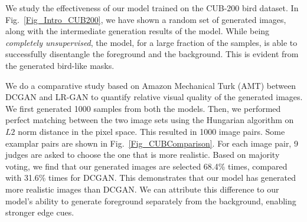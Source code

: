 \documentclass{article} \usepackage{iclr2017_conference,times}
\begin{document}
We study the effectiveness of our model trained on the CUB-200 bird dataset. In Fig.~\ref{Fig_Intro_CUB200}, we have shown a random set of generated images, along with the intermediate generation results of the model. While being \emph{completely unsupervised}, the model, for a large fraction of the samples, is able to successfully disentangle the foreground and the background. This is evident from the generated bird-like masks.


We do a comparative study based on Amazon Mechanical Turk (AMT) between DCGAN and LR-GAN to quantify relative visual quality of the generated images. We first generated 1000 samples from both the models. Then, we performed perfect matching between the two image sets using the Hungarian algorithm on $L2$ norm distance in the pixel space. This resulted in 1000 image pairs. Some examplar pairs are shown in Fig.~\ref{Fig_CUBComparison}. For each image pair, 9 judges are asked to choose the one that is more realistic. Based on majority voting, we find that our generated images are selected 68.4\% times, compared with 31.6\% times for DCGAN. This demonstrates that our model has generated more realistic images than DCGAN. We can attribute this difference to our model's ability to generate foreground separately from the background, enabling stronger edge cues. 
\end{document}
